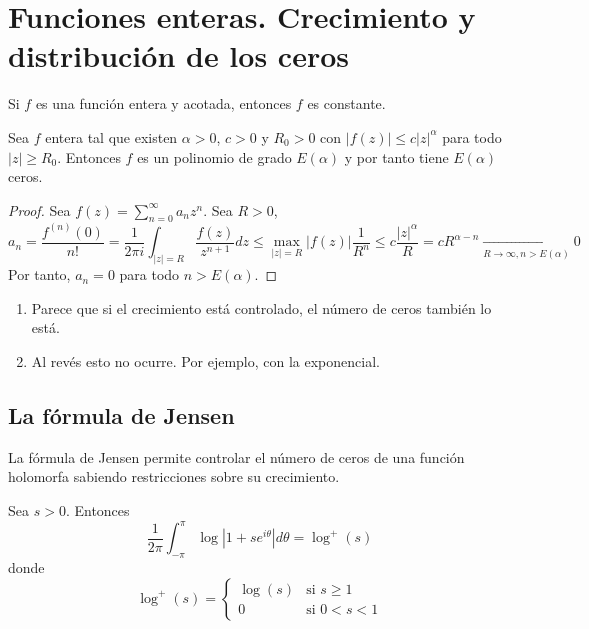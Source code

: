 \chapter{Funciones enteras. Crecimiento y distribución de los ceros}
\begin{theorem}
    Si $f$ es una función entera y acotada, entonces $f$ es constante.
\end{theorem}

\begin{theorem}
    Sea $f$ entera tal que existen $\alpha > 0$, $c > 0$ y $R_0 > 0$ con $|f(z)| \leq c|z|^\alpha$ para todo $|z| \geq R_0$.
    Entonces $f$ es un polinomio de grado $E(\alpha)$ y por tanto tiene $E(\alpha)$ ceros.
\end{theorem}

\begin{proof}
    Sea $f(z) = \sum_{n=0}^\infty a_nz^n$.
    Sea $R > 0$,
    $$a_n = \frac{f^{(n)}(0)}{n!} = \frac{1}{2\pi i} \int_{|z|=R} \frac{f(z)}{z^{n+1}}dz \leq \max_{|z|=R} |f(z)|\frac{1}{R^n} \leq c\frac{|z|^\alpha}{R} = cR^{\alpha-n} \xrightarrow[R \to \infty, n > E(\alpha)]{} 0$$
    Por tanto, $a_n = 0$ para todo $n > E(\alpha)$.
\end{proof}

\begin{remark}
    \hfill
    \begin{enumerate}
        \item Parece que si el crecimiento está controlado, el número de ceros también lo está.
        \item Al revés esto no ocurre.
              Por ejemplo, con la exponencial.
    \end{enumerate}
\end{remark}

\section{La fórmula de Jensen}
La fórmula de Jensen permite controlar el número de ceros de una función holomorfa sabiendo restricciones sobre su crecimiento.

\begin{lemma}
    Sea $s > 0$.
    Entonces
    $$\frac{1}{2\pi} \int_{-\pi}^\pi \log|1+se^{i\theta}|d\theta = \log^+(s)$$
    donde
    $$\log^+(s) = \begin{cases}
            \log(s) & \text{si } s \geq 1  \\
            0       & \text{si } 0 < s < 1
        \end{cases}$$
\end{lemma}

